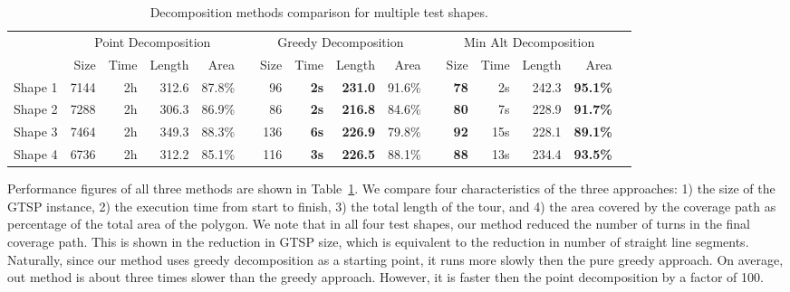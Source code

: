 \documentclass[../main.tex]{subfiles}
\begin{document}
\begin{table}
	\centering
	\begin{tabular}{@{} l rrrr l rrrr l rrrr l@{}}
		\toprule
		& \multicolumn{4}{c}{Point Decomposition} & \phantom{a} & \multicolumn{4}{c}{Greedy Decomposition} & \phantom{a} & \multicolumn{4}{c}{Min Alt Decomposition}\\
		\cmidrule{2-5} 		\cmidrule{7-10}  \cmidrule{12-15} 
		& Size & Time & Length & Area & & Size & Time & Length & Area & & Size & Time & Length & Area \\
		\midrule
		Shape 1 & 7144 & 2h & 312.6 & 87.8\% & & 96 & \bf{2s} & \bf{231.0} & 91.6\% & & \bf{78} & 2s & 242.3 & \bf{95.1\%}\\
		Shape 2 & 7288  & 2h & 306.3 & 86.9\% & & 86 & \bf{2s} & \bf{216.8} & 84.6\% & & \bf{80} & 7s & 228.9 & \bf{91.7\%} \\
		Shape 3 & 7464 & 2h & 349.3 & 88.3\% & & 136 & \bf{6s} & \bf{226.9} & 79.8\% & & \bf{92} & 15s & 228.1 & \bf{89.1\%} \\
		Shape 4 & 6736 & 2h & 312.2 & 85.1\% & & 116 & \bf{3s} & \bf{226.5} & 88.1\% & & \bf{88} & 13s & 234.4 & \bf{93.5\%}\\

		\bottomrule

	\end{tabular}
	\caption{Decomposition methods comparison for multiple test shapes.}
	\label{table:performance}
\end{table}


Performance figures of all three methods are shown in Table~\ref{table:performance}. We compare four characteristics of the three approaches: 1) the size of the GTSP instance, 2) the execution time from start to finish, 3) the total length of the tour, and 4) the area covered by the coverage path as percentage of the total area of the polygon. We note that in all four test shapes, our method reduced the number of turns in the final coverage path. This is shown in the reduction in GTSP size, which is equivalent to the reduction in number of straight line segments. Naturally, since our method uses greedy decomposition as a starting point, it runs more slowly then the pure greedy approach. On average, out method is about three times slower than the greedy approach. However, it is faster then the point decomposition by a factor of 100. 
\end{document}
